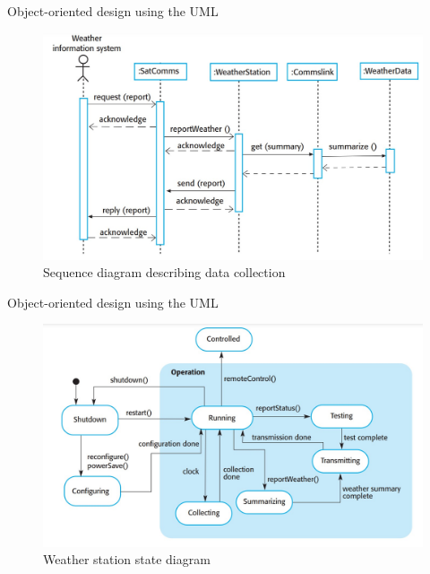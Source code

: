 \documentclass{beamer}
\begin{document}
\begin{frame}{Object-oriented design using the UML}
	\begin{figure}
	\includegraphics[scale=.4]{img/m3_7}
	\caption{Sequence 
		diagram describing 
		data collection
	}
\end{figure}
\end{frame}
\begin{frame}{Object-oriented design using the UML}
	\begin{figure}
		\includegraphics[scale=.4]{img/m3_8}
		\caption{Weather 
			station state diagram
		}
	\end{figure}
\end{frame}
\end{document}
